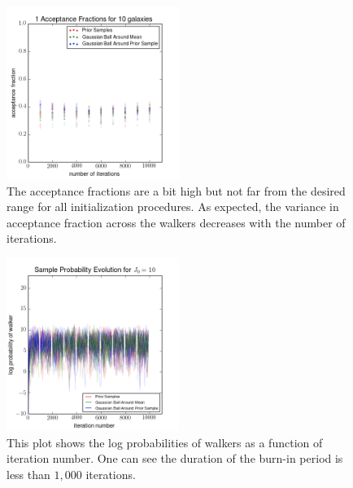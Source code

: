 \documentclass[preprint]{aastex}
\begin{document}
\begin{figure}
\includegraphics[width=0.5\textwidth]{toy/fracs.png}
\caption{The acceptance fractions are a bit high but not far from the desired range for all initialization procedures.  As expected, the variance in acceptance fraction across the walkers decreases with the number of iterations.}
\label{fig:dumbestfrac}
\end{figure}

\begin{figure}
\includegraphics[width=0.5\textwidth]{toy/probs.png}
\caption{This plot shows the log probabilities of walkers as a function of iteration number.  One can see the duration of the burn-in period is less than $1,000$ iterations.}
\label{fig:dumbestprob}
\end{figure}
\end{document}
